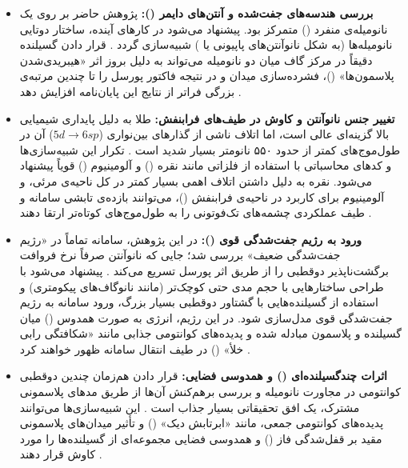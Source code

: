 \documentclass[12pt,a4paper]{report}
\begin{document}
\begin{itemize}
\item \textbf{بررسی هندسه‌های جفت‌شده و آنتن‌های دایمر ():} پژوهش حاضر بر روی یک نانومیله‌ی منفرد () متمرکز بود. پیشنهاد می‌شود در کارهای آینده، ساختار دوتایی نانومیله‌ها (به شکل نانوآنتن‌های پاپیونی یا ) شبیه‌سازی گردد \cite{maier,giannini}. قرار دادن گسیلنده دقیقاً در مرکز گاف میان دو نانومیله می‌تواند به دلیل بروز اثر «هیبریدی‌شدن پلاسمون‌ها» ()، فشرده‌سازی میدان و در نتیجه فاکتور پورسل را تا چندین مرتبه‌ی بزرگی فراتر از نتایج این پایان‌نامه افزایش دهد \cite{maier,novotny}.

\item \textbf{تغییر جنس نانوآنتن و کاوش در طیف‌های فرابنفش:} طلا به دلیل پایداری شیمیایی بالا گزینه‌ای عالی است، اما اتلاف ناشی از گذارهای بین‌نواری ($5d\to6sp$) آن در طول‌موج‌های کمتر از حدود ۵۵۰ نانومتر بسیار شدید است \cite{maier,jc}. تکرار این شبیه‌سازی‌ها و کدهای محاسباتی با استفاده از فلزاتی مانند نقره () و آلومینیوم () قویاً پیشنهاد می‌شود. نقره به دلیل داشتن اتلاف اهمی بسیار کمتر در کل ناحیه‌ی مرئی، و آلومینیوم برای کاربرد در ناحیه‌ی فرابنفش ()، می‌توانند بازده‌ی تابشی سامانه و طیف عملکردی چشمه‌های تک‌فوتونی را به طول‌موج‌های کوتاه‌تر ارتقا دهند \cite{maier}.

\item \textbf{ورود به رژیم جفت‌شدگی قوی ():} در این پژوهش، سامانه تماماً در «رژیم جفت‌شدگی ضعیف» بررسی شد؛ جایی که نانوآنتن صرفاً نرخ فروافت برگشت‌ناپذیر دوقطبی را از طریق اثر پورسل تسریع می‌کند \cite{novotny}. پیشنهاد می‌شود با طراحی ساختارهایی با حجم مدی حتی کوچک‌تر (مانند نانوگاف‌های پیکومتری) و استفاده از گسیلنده‌هایی با گشتاور دوقطبی بسیار بزرگ، ورود سامانه به رژیم جفت‌شدگی قوی مدل‌سازی شود. در این رژیم، انرژی به صورت همدوس () میان گسیلنده و پلاسمون مبادله شده و پدیده‌های کوانتومی جذابی مانند «شکافتگی رابی خلأ» () در طیف انتقال سامانه ظهور خواهند کرد \cite{novotny,maier}.

\item \textbf{اثرات چندگسیلنده‌ای () و همدوسی فضایی:} قرار دادن هم‌زمان چندین دوقطبی کوانتومی در مجاورت نانومیله و بررسی برهم‌کنش آن‌ها از طریق مدهای پلاسمونی مشترک، یک افق تحقیقاتی بسیار جذاب است \cite{novotny}. این شبیه‌سازی‌ها می‌توانند پدیده‌های کوانتومی جمعی، مانند «ابرتابش دیک» () و تأثیر میدان‌های پلاسمونی مقید بر قفل‌شدگی فاز () و همدوسی فضایی مجموعه‌ای از گسیلنده‌ها را مورد کاوش قرار دهند \cite{novotny,maier}.
\end{itemize}
\end{document}

